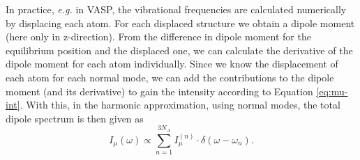 \documentclass[11pt,DIV=13,BCOR=5mm,a4paper,headinclude]{scrbook}
\begin{document}
\begin{itemize}
In practice, \textit{e.g.} in VASP, the vibrational frequencies are calculated numerically by displacing each atom.
For each displaced structure we obtain a dipole moment (here only in z-direction).
From the difference in dipole moment for the equilibrium position and the displaced one, we can calculate the derivative of the dipole moment for each atom individually.
Since we know the displacement of each atom for each normal mode, we can add the contributions to the dipole moment (and its derivative) to gain the intensity according to Equation \ref{eq:mu-int}.
With this, in the harmonic approximation, using normal modes, the total dipole spectrum is then given as\cite{dyn-dip,Yang2012}
\begin{equation}\label{eq:mu-int-total}
I_\mu(\omega) \propto \sum_{n=1}^{3N_A}I_{\mu}^{(n)}\cdot \delta(\omega - \omega_n).
\end{equation}



\end{itemize}
\end{document}
